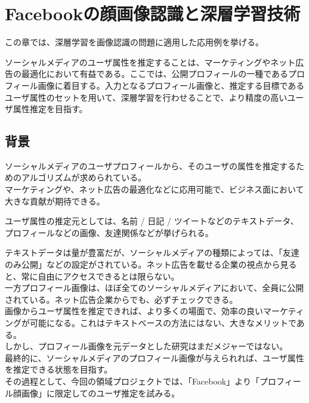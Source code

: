 \chapter{Facebookの顔画像認識と深層学習技術}
この章では、深層学習を画像認識の問題に適用した応用例を挙げる。\par
ソーシャルメディアのユーザ属性を推定することは、マーケティングやネット広告の最適化において有益である。ここでは、公開プロフィールの一種であるプロフィール画像に着目する。入力となるプロフィール画像と、推定する目標であるユーザ属性のセットを用いて、深層学習を行わせることで、より精度の高いユーザ属性推定を目指す。

\section{背景}
ソーシャルメディアのユーザプロフィールから、そのユーザの属性を推定するためのアルゴリズムが求められている。\\
マーケティングや、ネット広告の最適化などに応用可能で、ビジネス面において大きな貢献が期待できる。\par
ユーザ属性の推定元としては、名前 / 日記 / ツイートなどのテキストデータ、プロフィールなどの画像、友達関係などが挙げられる。\cite{pennacchiotti2011a-machine}

テキストデータは量が豊富だが、ソーシャルメディアの種類によっては、「友達のみ公開」などの設定がされている。ネット広告を載せる企業の視点から見ると、常に自由にアクセスできるとは限らない。\\

一方プロフィール画像は、ほぼ全てのソーシャルメディアにおいて、全員に公開されている。ネット広告企業からでも、必ずチェックできる。\\

画像からユーザ属性を推定できれば、より多くの場面で、効率の良いマーケティングが可能になる。これはテキストベースの方法にはない、大きなメリットである。\\

しかし、プロフィール画像を元データとした研究はまだメジャーではない。\\
最終的に、ソーシャルメディアのプロフィール画像が与えられれば、ユーザ属性を推定できる状態を目指す。\\
その過程として、今回の領域プロジェクトでは、「Facebook」より「プロフィール顔画像」に限定してのユーザ推定を試みる。\par


